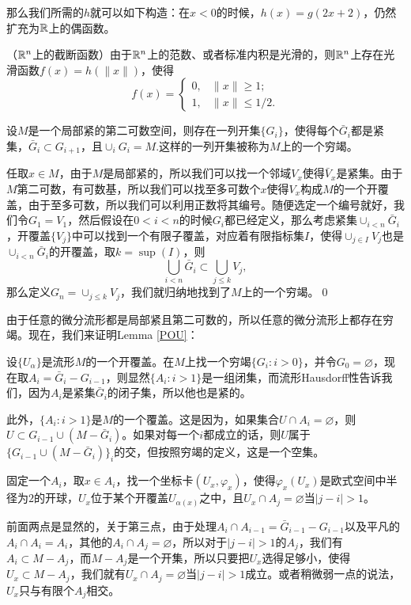 那么我们所需的$h$就可以如下构造：在$x<0$的时候，$h(x)=g(2x+2)$，仍然扩充为$\mathbb{R}$上的偶函数。

\para （$\mathbb{R}^n$上的截断函数）由于$\mathbb{R}^n$上的范数、或者标准内积是光滑的，则$\mathbb{R}^n$上存在光滑函数$f(x)=h(\|x\|)$，使得
\[
	f(x)=
		\begin{cases}
		0,&\|x\|\geq 1;\\
		1,&\|x\|\leq 1/2.
		\end{cases}
\]

\para 设$M$是一个局部紧的第二可数空间，则存在一列开集$\{G_i\}$，使得每个$\bar{G}_i$都是紧集，$\bar{G}_i\subset G_{i+1}$，且$\cup_iG_i=M$.这样的一列开集被称为$M$上的一个穷竭。

\proof 任取$x\in M$，由于$M$是局部紧的，所以我们可以找一个邻域$V_x$使得$\bar{V}_x$是紧集。由于$M$第二可数，有可数基，所以我们可以找至多可数个$x$使得$V_x$构成$M$的一个开覆盖，由于至多可数，所以我们可以利用正数将其编号。随便选定一个编号就好，我们令$G_1=V_1$，然后假设在$0<i<n$的时候$G_i$都已经定义，那么考虑紧集$\cup_{i<n}\bar{G}_i$，开覆盖$\{V_j\}$中可以找到一个有限子覆盖，对应着有限指标集$I$，使得$\cup_{j\in I}V_j$也是$\cup_{i<n}\bar{G}_i$的开覆盖，取$k=\sup(I)$，则
\[
	\bigcup_{i<n}\bar{G}_i\subset \bigcup_{j\leq k}V_j,
\]
那么定义$G_n=\cup_{j\leq k}V_j$，我们就归纳地找到了$M$上的一个穷竭。\qed

由于任意的微分流形都是局部紧且第二可数的，所以任意的微分流形上都存在穷竭。现在，我们来证明Lemma \ref{POU}：

\proof 设$\{U_{\alpha}\}$是流形$M$的一个开覆盖。在$M$上找一个穷竭$\{G_i:i>0\}$，并令$G_0=\varnothing$，现在取$A_i=\bar{G}_i-G_{i-1}$，则显然$\{A_i:i>1\}$是一组闭集，而流形Hausdorff性告诉我们，因为$A_i$是紧集$\bar{G}_i$的闭子集，所以他也是紧的。

此外，$\{A_i:i>1\}$是$M$的一个覆盖。这是因为，如果集合$U\cap A_i=\varnothing$，则$U\subset G_{i-1}\cup (M-\bar{G}_{i})$。如果对每一个$i$都成立的话，则$U$属于$\{G_{i-1}\cup (M-\bar{G}_{i})\}_i$的交，但按照穷竭的定义，这是一个空集。

固定一个$A_i$，取$x\in A_i$，找一个坐标卡$(U_x,\varphi_x)$，使得$\varphi_x(U_x)$是欧式空间中半径为$2$的开球，$U_x$位于某个开覆盖$U_{\alpha(x)}$之中，且$U_x\cap A_j=\varnothing$当$|j-i|>1$。

前面两点是显然的，关于第三点，由于处理$A_i\cap A_{i-1}= \bar{G}_{i-1}-G_{i-1}$以及平凡的$A_i\cap A_i=A_i$，其他的$A_i\cap A_j=\varnothing$，所以对于$|j-i|>1$的$A_j$，我们有$A_i\subset M-A_j$，而$M-A_j$是一个开集，所以只要把$U_x$选得足够小，使得$U_x\subset M-A_j$，我们就有$U_x\cap A_j=\varnothing$当$|j-i|>1$成立。或者稍微弱一点的说法，$U_x$只与有限个$A_j$相交。

